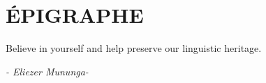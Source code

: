 \chapter*{ÉPIGRAPHE}
\vspace*{3cm}

\begin{center}
    {\large Believe in yourself and help preserve our linguistic heritage.}
\end{center}

\vspace*{1em}

\begin{flushright}
    \textit{- Eliezer Mununga-}
\end{flushright}
